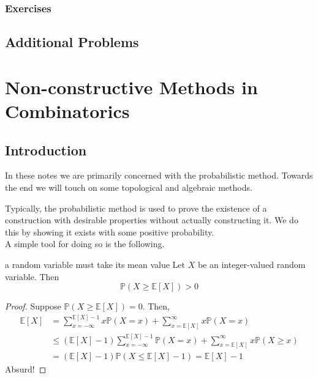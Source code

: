 \documentclass{article}
\newcounter{statementcount}
\begin{document}
\subsubsection*{Exercises}

\newpage

\subsection{Additional Problems}

\newpage

\section{Non-constructive Methods in Combinatorics}

\setcounter{statementcount}{1}

\subsection{Introduction}

In these notes we are primarily concerned with the probabilistic method. Towards the end we will touch on 
some topological and algebraic methods. 

Typically, the probabilistic method is used to prove the existence of a construction with desirable properties 
without actually constructing it. We do this by showing it exists with some positive probability.   \\

A simple tool for doing so is the following. 

\begin{lemma}[]{a random variable must take its mean value}
    Let $X$ be an integer-valued random variable. Then \[\mathbb{P}(X \geq \mathbb{E}[X]) > 0\]
\end{lemma}

\begin{proof}
    Suppose $\mathbb{P}(X \geq \mathbb{E}[X]) = 0$. Then, 
    \begin{align*}
        \mathbb{E}[X] &= \sum_{x = - \infty}^{\mathbb{E}[X] - 1}x\mathbb{P}(X = x) + \sum_{x = \mathbb{E}[X]}^\infty 
        x\mathbb{P}(X = x) \\ &\leq (\mathbb{E}[X] - 1)\sum_{x = - \infty}^{\mathbb{E}[X] - 1}\mathbb{P}(X = x) + 
        \sum_{x = \mathbb{E}[X]}^\infty x\mathbb{P}(X \geq x) \\ &= (\mathbb{E}[X] - 1)\mathbb{P}(X \leq \mathbb{E}[X] - 1)
        = \mathbb{E}[X] - 1
    \end{align*}
    Absurd!
\end{proof}
\end{document}
